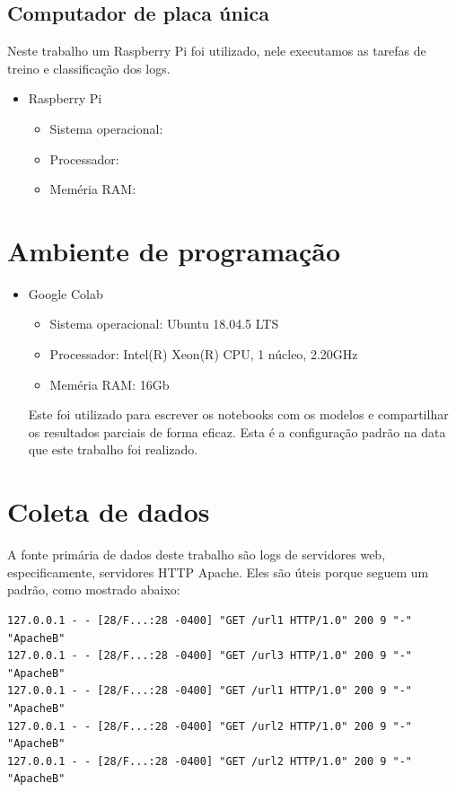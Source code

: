 \subsection{Computador de placa única}

Neste trabalho um Raspberry Pi foi utilizado, nele executamos as tarefas de treino e classificação
dos logs.

\begin{itemize}
    \item Raspberry Pi
        \begin{itemize}
            \item Sistema operacional: 
            \item Processador: 
            \item Meméria RAM: 
        \end{itemize}
\end{itemize}

\section{Ambiente de programação}
\begin{itemize}
    \item Google Colab
        \begin{itemize}
            \item Sistema operacional: Ubuntu 18.04.5 LTS
            \item Processador: Intel(R) Xeon(R) CPU, 1 núcleo, 2.20GHz
            \item Meméria RAM: 16Gb
        \end{itemize} 
        Este foi utilizado para escrever os notebooks com os modelos e compartilhar os resultados
        parciais de forma eficaz. Esta é a configuração padrão na data que este
        trabalho foi realizado.
\end{itemize}

\section{Coleta de dados}

A fonte primária de dados deste trabalho são logs de servidores web, especificamente,
servidores HTTP Apache. Eles são úteis porque seguem um padrão, como mostrado abaixo:

\begin{verbatim}
127.0.0.1 - - [28/F...:28 -0400] "GET /url1 HTTP/1.0" 200 9 "-" "ApacheB"
127.0.0.1 - - [28/F...:28 -0400] "GET /url3 HTTP/1.0" 200 9 "-" "ApacheB"
127.0.0.1 - - [28/F...:28 -0400] "GET /url1 HTTP/1.0" 200 9 "-" "ApacheB"
127.0.0.1 - - [28/F...:28 -0400] "GET /url2 HTTP/1.0" 200 9 "-" "ApacheB"
127.0.0.1 - - [28/F...:28 -0400] "GET /url2 HTTP/1.0" 200 9 "-" "ApacheB"
\end{verbatim}

